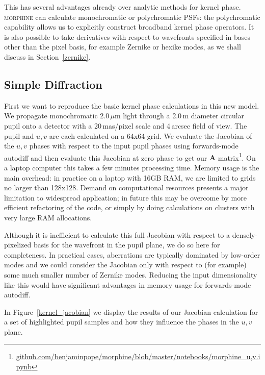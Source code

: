 \documentclass[modern]{aastex63}
\begin{document}
This has several advantages already over analytic methods for kernel phase. \textsc{morphine} can calculate monochromatic or polychromatic PSFs: the polychromatic capability allows us to explicitly construct broadband kernel phase operators. It is also possible to take derivatives with respect to wavefronts specified in bases other than the pixel basis, for example Zernike or hexike modes, as we shall discuss in Section~\ref{zernike}.

\subsection{Simple Diffraction}
\label{sec:simple}

First we want to reproduce the basic kernel phase calculations in this new model. We propagate monochromatic 2.0\,$\mu$m light through a 2.0\,m diameter circular pupil onto a detector with a 20\,mas/pixel scale and 4\,arcsec field of view. The pupil and $u,v$ are each calculated on a 64x64 grid. We evaluate the Jacobian of the $u,v$ phases with respect to the input pupil phases using forwards-mode autodiff and then evaluate this Jacobian at zero phase to get our $\mathbf{A}$ matrix\footnote{\href{https://github.com/benjaminpope/morphine/blob/master/notebooks/morphine_u,v.ipynb}{github.com/benjaminpope/morphine/blob/master/notebooks/morphine\_u,v.ipynb}}. On a laptop computer this takes a few minutes processing time. Memory usage is the main overhead: in practice on a laptop with 16GB RAM, we are limited to grids no larger than 128x128. Demand on computational resources presents a major limitation to widespread application; in future this may be overcome by more efficient refactoring of the code, or simply by doing calculations on clusters with very large RAM allocations.

Although it is inefficient to calculate this full Jacobian with respect to a densely-pixelized basis for the wavefront in the pupil plane, we do so here for completeness. In practical cases, aberrations are typically dominated by low-order modes and we could consider the Jacobian only with respect to (for example) some much smaller number of Zernike modes. Reducing the input dimensionality like this would have significant advantages in memory usage for forwards-mode autodiff.

In Figure~\ref{kernel_jacobian} we display the results of our Jacobian calculation for a set of highlighted pupil samples and how they influence the phases in the $u,v$ plane. 
\end{document}
